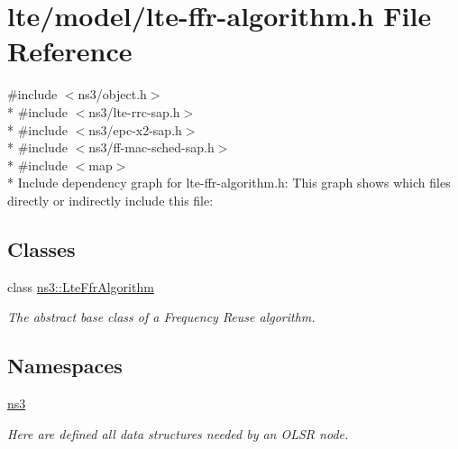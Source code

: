 \hypertarget{lte-ffr-algorithm_8h}{}\section{lte/model/lte-\/ffr-\/algorithm.h File Reference}
\label{lte-ffr-algorithm_8h}
{\ttfamily \#include $<$ns3/object.\+h$>$}\\*
{\ttfamily \#include $<$ns3/lte-\/rrc-\/sap.\+h$>$}\\*
{\ttfamily \#include $<$ns3/epc-\/x2-\/sap.\+h$>$}\\*
{\ttfamily \#include $<$ns3/ff-\/mac-\/sched-\/sap.\+h$>$}\\*
{\ttfamily \#include $<$map$>$}\\*
Include dependency graph for lte-\/ffr-\/algorithm.h\+:
This graph shows which files directly or indirectly include this file\+:
\subsection*{Classes}
\begin{DoxyCompactItemize}
\item 
class \hyperlink{classns3_1_1LteFfrAlgorithm}{ns3\+::\+Lte\+Ffr\+Algorithm}
\begin{DoxyCompactList}\small\item\em The abstract base class of a Frequency Reuse algorithm. \end{DoxyCompactList}\end{DoxyCompactItemize}
\subsection*{Namespaces}
\begin{DoxyCompactItemize}
\item 
 \hyperlink{namespacens3}{ns3}
\begin{DoxyCompactList}\small\item\em Here are defined all data structures needed by an O\+L\+SR node. \end{DoxyCompactList}\end{DoxyCompactItemize}
